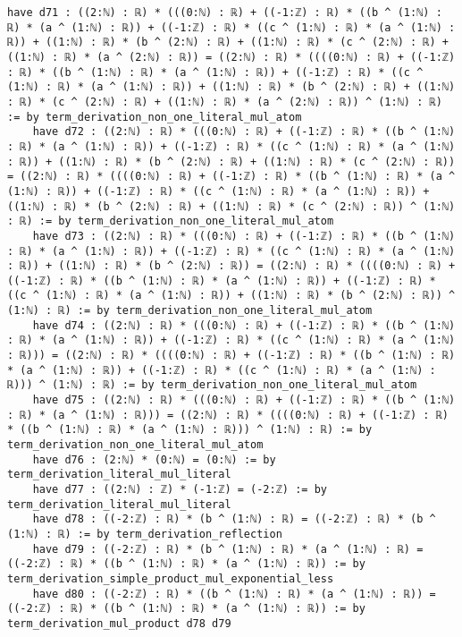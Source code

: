\documentclass{article}
\begin{document}
\begin{tcolorbox}[colback=white!10, width=\linewidth]
\begin{lstlisting}[language=Lean4]
    have d71 : ((2:ℕ) : ℝ) * (((0:ℕ) : ℝ) + ((-1:ℤ) : ℝ) * ((b ^ (1:ℕ) : ℝ) * (a ^ (1:ℕ) : ℝ)) + ((-1:ℤ) : ℝ) * ((c ^ (1:ℕ) : ℝ) * (a ^ (1:ℕ) : ℝ)) + ((1:ℕ) : ℝ) * (b ^ (2:ℕ) : ℝ) + ((1:ℕ) : ℝ) * (c ^ (2:ℕ) : ℝ) + ((1:ℕ) : ℝ) * (a ^ (2:ℕ) : ℝ)) = ((2:ℕ) : ℝ) * ((((0:ℕ) : ℝ) + ((-1:ℤ) : ℝ) * ((b ^ (1:ℕ) : ℝ) * (a ^ (1:ℕ) : ℝ)) + ((-1:ℤ) : ℝ) * ((c ^ (1:ℕ) : ℝ) * (a ^ (1:ℕ) : ℝ)) + ((1:ℕ) : ℝ) * (b ^ (2:ℕ) : ℝ) + ((1:ℕ) : ℝ) * (c ^ (2:ℕ) : ℝ) + ((1:ℕ) : ℝ) * (a ^ (2:ℕ) : ℝ)) ^ (1:ℕ) : ℝ) := by term_derivation_non_one_literal_mul_atom
    have d72 : ((2:ℕ) : ℝ) * (((0:ℕ) : ℝ) + ((-1:ℤ) : ℝ) * ((b ^ (1:ℕ) : ℝ) * (a ^ (1:ℕ) : ℝ)) + ((-1:ℤ) : ℝ) * ((c ^ (1:ℕ) : ℝ) * (a ^ (1:ℕ) : ℝ)) + ((1:ℕ) : ℝ) * (b ^ (2:ℕ) : ℝ) + ((1:ℕ) : ℝ) * (c ^ (2:ℕ) : ℝ)) = ((2:ℕ) : ℝ) * ((((0:ℕ) : ℝ) + ((-1:ℤ) : ℝ) * ((b ^ (1:ℕ) : ℝ) * (a ^ (1:ℕ) : ℝ)) + ((-1:ℤ) : ℝ) * ((c ^ (1:ℕ) : ℝ) * (a ^ (1:ℕ) : ℝ)) + ((1:ℕ) : ℝ) * (b ^ (2:ℕ) : ℝ) + ((1:ℕ) : ℝ) * (c ^ (2:ℕ) : ℝ)) ^ (1:ℕ) : ℝ) := by term_derivation_non_one_literal_mul_atom
    have d73 : ((2:ℕ) : ℝ) * (((0:ℕ) : ℝ) + ((-1:ℤ) : ℝ) * ((b ^ (1:ℕ) : ℝ) * (a ^ (1:ℕ) : ℝ)) + ((-1:ℤ) : ℝ) * ((c ^ (1:ℕ) : ℝ) * (a ^ (1:ℕ) : ℝ)) + ((1:ℕ) : ℝ) * (b ^ (2:ℕ) : ℝ)) = ((2:ℕ) : ℝ) * ((((0:ℕ) : ℝ) + ((-1:ℤ) : ℝ) * ((b ^ (1:ℕ) : ℝ) * (a ^ (1:ℕ) : ℝ)) + ((-1:ℤ) : ℝ) * ((c ^ (1:ℕ) : ℝ) * (a ^ (1:ℕ) : ℝ)) + ((1:ℕ) : ℝ) * (b ^ (2:ℕ) : ℝ)) ^ (1:ℕ) : ℝ) := by term_derivation_non_one_literal_mul_atom
    have d74 : ((2:ℕ) : ℝ) * (((0:ℕ) : ℝ) + ((-1:ℤ) : ℝ) * ((b ^ (1:ℕ) : ℝ) * (a ^ (1:ℕ) : ℝ)) + ((-1:ℤ) : ℝ) * ((c ^ (1:ℕ) : ℝ) * (a ^ (1:ℕ) : ℝ))) = ((2:ℕ) : ℝ) * ((((0:ℕ) : ℝ) + ((-1:ℤ) : ℝ) * ((b ^ (1:ℕ) : ℝ) * (a ^ (1:ℕ) : ℝ)) + ((-1:ℤ) : ℝ) * ((c ^ (1:ℕ) : ℝ) * (a ^ (1:ℕ) : ℝ))) ^ (1:ℕ) : ℝ) := by term_derivation_non_one_literal_mul_atom
    have d75 : ((2:ℕ) : ℝ) * (((0:ℕ) : ℝ) + ((-1:ℤ) : ℝ) * ((b ^ (1:ℕ) : ℝ) * (a ^ (1:ℕ) : ℝ))) = ((2:ℕ) : ℝ) * ((((0:ℕ) : ℝ) + ((-1:ℤ) : ℝ) * ((b ^ (1:ℕ) : ℝ) * (a ^ (1:ℕ) : ℝ))) ^ (1:ℕ) : ℝ) := by term_derivation_non_one_literal_mul_atom
    have d76 : (2:ℕ) * (0:ℕ) = (0:ℕ) := by term_derivation_literal_mul_literal
    have d77 : ((2:ℕ) : ℤ) * (-1:ℤ) = (-2:ℤ) := by term_derivation_literal_mul_literal
    have d78 : ((-2:ℤ) : ℝ) * (b ^ (1:ℕ) : ℝ) = ((-2:ℤ) : ℝ) * (b ^ (1:ℕ) : ℝ) := by term_derivation_reflection
    have d79 : ((-2:ℤ) : ℝ) * (b ^ (1:ℕ) : ℝ) * (a ^ (1:ℕ) : ℝ) = ((-2:ℤ) : ℝ) * ((b ^ (1:ℕ) : ℝ) * (a ^ (1:ℕ) : ℝ)) := by term_derivation_simple_product_mul_exponential_less
    have d80 : ((-2:ℤ) : ℝ) * ((b ^ (1:ℕ) : ℝ) * (a ^ (1:ℕ) : ℝ)) = ((-2:ℤ) : ℝ) * ((b ^ (1:ℕ) : ℝ) * (a ^ (1:ℕ) : ℝ)) := by term_derivation_mul_product d78 d79

\end{lstlisting}
\end{tcolorbox}
\end{document}
